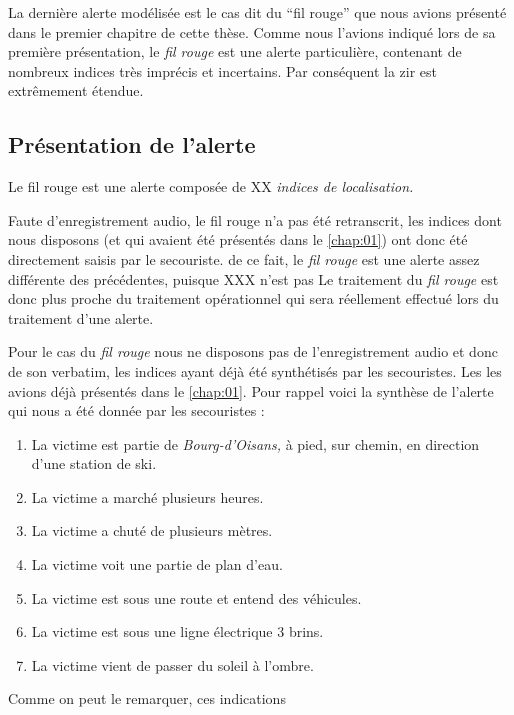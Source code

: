
La dernière alerte modélisée est le cas dit du \enquote{fil rouge} que
nous avions présenté dans le premier chapitre de cette thèse. Comme
nous l'avions indiqué lors de sa première présentation, le \emph{fil
  rouge} est une alerte particulière, contenant de nombreux indices
très imprécis et incertains. Par conséquent la \ac{zir} est
extrêmement étendue.


\subsection{Présentation de l'alerte}
\label{subsec:9-4-1}

Le fil rouge est une alerte composée de XX \emph{indices de
  localisation.}


Faute d'enregistrement audio, le fil rouge n'a pas été retranscrit,
les indices dont nous disposons (et qui avaient été présentés dans le
\autoref{chap:01}) ont donc été directement saisis par le secouriste.
%
de ce fait, le \emph{fil rouge} est une alerte assez différente des
précédentes, puisque XXX n'est pas
%
Le traitement du \emph{fil rouge} est donc plus proche du traitement
opérationnel qui sera réellement effectué lors du traitement d'une
alerte.


Pour le cas du \emph{fil rouge} nous ne disposons pas de
l'enregistrement audio et donc de son verbatim, les indices ayant déjà 
été synthétisés par les secouristes. Les les avions déjà présentés
dans le \autoref{chap:01}.
%
Pour rappel voici la synthèse de l'alerte qui nous a été donnée par
les secouristes :
%
\begin{enumerate}
\item La victime est partie de \emph{Bourg-d'Oisans,} à pied, sur
  chemin, en direction d'une station de ski.
\item La victime a marché plusieurs heures.
\item La victime a chuté de plusieurs mètres.
\item La victime voit une partie de plan d'eau.
\item La victime est sous une route et entend des véhicules.
\item La victime est sous une ligne électrique 3 brins.
\item La victime vient de passer du soleil à l'ombre.
\end{enumerate}


Comme on peut le remarquer, ces indications 

